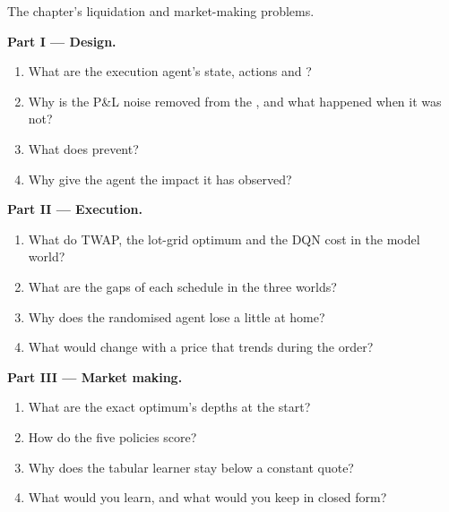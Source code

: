 \begin{problem}\label{pb:ml:reinforcement-learning-for-execution-and-market-making:1}
The chapter's liquidation and market-making problems.

\medskip\noindent\textbf{Part I --- Design.}
\begin{enumerate}
\item What are the execution agent's state, actions and ?
\item Why is the P\&L noise removed from the , and what happened when it was not?
\item What does  prevent?
\item Why give the agent the impact it has observed?
\end{enumerate}

\medskip\noindent\textbf{Part II --- Execution.}
\begin{enumerate}[resume]
\item What do TWAP, the lot-grid optimum and the DQN cost in the model world?
\item What are the gaps of each schedule in the three worlds?
\item Why does the randomised agent lose a little at home?
\item What would change with a price that trends during the order?
\end{enumerate}

\medskip\noindent\textbf{Part III --- Market making.}
\begin{enumerate}[resume]
\item What are the exact optimum's depths at the start?
\item How do the five policies score?
\item Why does the tabular learner stay below a constant quote?
\item What would you learn, and what would you keep in closed form?
\end{enumerate}


\end{problem}
